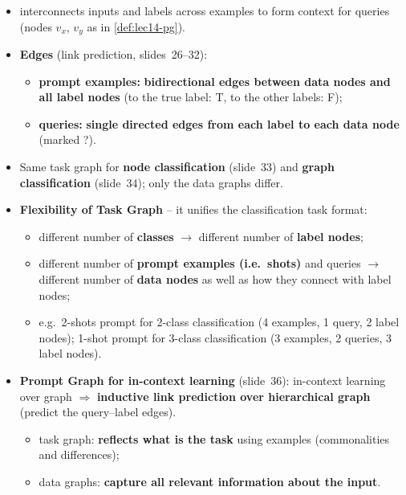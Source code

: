 \begin{itemize}
  \item {} interconnects inputs and labels across examples to form
    context for queries (nodes $v_x$, $v_y$ as in \cref{def:lec14-pg}).
  \item \textbf{Edges} (link prediction, slides~26--32):
    \begin{itemize}
      \item \textbf{prompt examples:} \textbf{bidirectional edges between data nodes and
        all label nodes} (to the true label: T, to the other labels: F);
      \item \textbf{queries:} \textbf{single directed edges from each label to each data
        node} (marked ?).
    \end{itemize}
  \item Same task graph for \textbf{node classification} (slide~33) and \textbf{graph
    classification} (slide~34); only the data graphs differ.
  \item \textbf{Flexibility of Task Graph} -- it unifies the classification task format:
    \begin{itemize}
      \item different number of \textbf{classes} $\to$ different number of \textbf{label
        nodes};
      \item different number of \textbf{prompt examples (i.e.\ shots)} and queries $\to$
        different number of \textbf{data nodes} as well as how they connect with label
        nodes;
      \item e.g.\ 2-shots prompt for 2-class classification (4 examples, 1 query, 2 label
        nodes); 1-shot prompt for 3-class classification (3 examples, 2 queries, 3 label
        nodes).
    \end{itemize}
  \item \textbf{Prompt Graph for in-context learning} (slide~36): in-context learning over
    graph $\Rightarrow$ \textbf{inductive link prediction over hierarchical graph}
    (predict the query--label edges).
    \begin{itemize}
      \item task graph: \textbf{reflects what is the task} using examples (commonalities and
        differences);
      \item data graphs: \textbf{capture all relevant information about the input}.
    \end{itemize}
\end{itemize}


